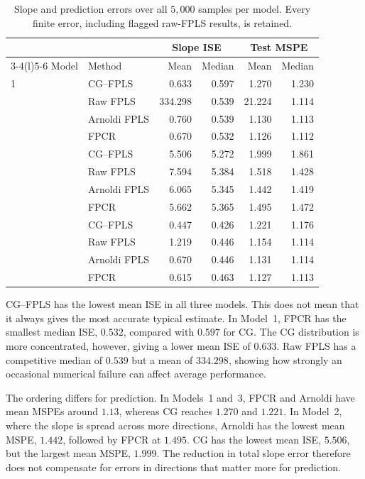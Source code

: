 \begin{table}[htbp]
    \centering
    \small
    \caption[Main simulation estimation and prediction results]{Slope and prediction errors over all $5{,}000$ samples per
    model. Every finite error, including flagged raw-FPLS results, is retained.}
    \label{main:tab:simulation-risk}
    \begin{tabular}{@{}llrrrr@{}}
        \toprule
        & & \multicolumn{2}{c}{Slope ISE} & \multicolumn{2}{c}{Test MSPE}\\
        \cmidrule(lr){3-4}\cmidrule(l){5-6}
        Model & Method & Mean & Median & Mean & Median\\
        \midrule
        1 & CG--FPLS     & 0.633 & 0.597 & 1.270 & 1.230\\
          & Raw FPLS     & 334.298 & 0.539 & 21.224 & 1.114\\
          & Arnoldi FPLS & 0.760 & 0.539 & 1.130 & 1.113\\
          & FPCR         & 0.670 & 0.532 & 1.126 & 1.112\\
        \addlinespace
        2 & CG--FPLS     & 5.506 & 5.272 & 1.999 & 1.861\\
          & Raw FPLS     & 7.594 & 5.384 & 1.518 & 1.428\\
          & Arnoldi FPLS & 6.065 & 5.345 & 1.442 & 1.419\\
          & FPCR         & 5.662 & 5.365 & 1.495 & 1.472\\
        \addlinespace
        3 & CG--FPLS     & 0.447 & 0.426 & 1.221 & 1.176\\
          & Raw FPLS     & 1.219 & 0.446 & 1.154 & 1.114\\
          & Arnoldi FPLS & 0.670 & 0.446 & 1.131 & 1.114\\
          & FPCR         & 0.615 & 0.463 & 1.127 & 1.113\\
        \bottomrule
    \end{tabular}
\end{table}

CG--FPLS has the lowest mean ISE in all three models. This does not
mean that it always gives the most accurate typical estimate. In Model~1,
FPCR has the smallest median ISE, $0.532$, compared with $0.597$ for CG.
The CG distribution is more concentrated, however, giving a lower mean
ISE of $0.633$. Raw FPLS has a competitive median of $0.539$ but a mean
of $334.298$, showing how strongly an occasional numerical failure can
affect average performance.

The ordering differs for prediction. In Models~1 and~3, FPCR and Arnoldi
have mean MSPEs around $1.13$, whereas CG reaches $1.270$ and $1.221$.
In Model~2, where the slope is spread across more directions, Arnoldi
has the lowest mean MSPE, $1.442$, followed by FPCR at $1.495$.
CG has the lowest mean ISE, $5.506$, but the largest mean MSPE, $1.999$.
The reduction in total slope error therefore does not compensate for
errors in directions that matter more for prediction.

